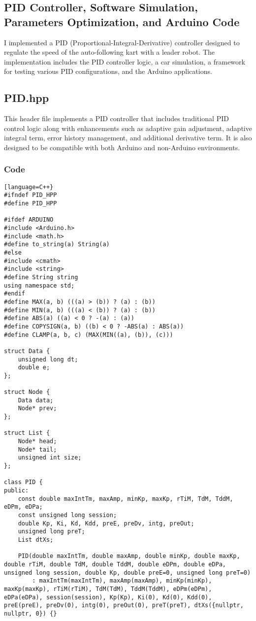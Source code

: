 \documentclass[a4paper,12pt]{article}
\begin{document}
\begin{lstlising}[language=C++]
\section{PID Controller, Software Simulation, Parameters Optimization, and Arduino Code}
I implemented a PID (Proportional-Integral-Derivative) controller designed to regulate the speed of the auto-following kart with a leader robot. The implementation includes the PID controller logic, a car simulation, a framework for testing various PID configurations, and the Arduino applications.
\subsection{PID.hpp}
This header file implements a PID controller that includes traditional PID control logic along with enhancements such as adaptive gain adjustment, adaptive integral term, error history management, and additional derivative term. It is also designed to be compatible with both Arduino and non-Arduino environments.
\subsubsection{Code}
\begin{lstlisting}[language=C++}
#ifndef PID_HPP
#define PID_HPP

#ifdef ARDUINO
#include <Arduino.h>
#include <math.h>
#define to_string(a) String(a)
#else
#include <cmath>
#include <string>
#define String string
using namespace std;
#endif
#define MAX(a, b) (((a) > (b)) ? (a) : (b))
#define MIN(a, b) (((a) < (b)) ? (a) : (b))
#define ABS(a) ((a) < 0 ? -(a) : (a))
#define COPYSIGN(a, b) ((b) < 0 ? -ABS(a) : ABS(a))
#define CLAMP(a, b, c) (MAX(MIN((a), (b)), (c)))

struct Data {
    unsigned long dt;
    double e;
};

struct Node {
    Data data;
    Node* prev;
};

struct List {
    Node* head;
    Node* tail;
    unsigned int size;
};

class PID {
public:
    const double maxIntTm, maxAmp, minKp, maxKp, rTiM, TdM, TddM, eDPm, eDPa;
    const unsigned long session;
    double Kp, Ki, Kd, Kdd, preE, preDv, intg, preOut;
    unsigned long preT;
    List dtXs;

    PID(double maxIntTm, double maxAmp, double minKp, double maxKp, double rTiM, double TdM, double TddM, double eDPm, double eDPa, unsigned long session, double Kp, double preE=0, unsigned long preT=0)
        : maxIntTm(maxIntTm), maxAmp(maxAmp), minKp(minKp), maxKp(maxKp), rTiM(rTiM), TdM(TdM), TddM(TddM), eDPm(eDPm), eDPa(eDPa), session(session), Kp(Kp), Ki(0), Kd(0), Kdd(0), preE(preE), preDv(0), intg(0), preOut(0), preT(preT), dtXs({nullptr, nullptr, 0}) {}


\end{lstlisting}
\end{lstlising}
\end{document}

